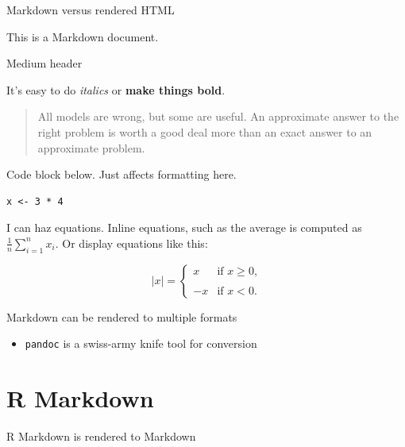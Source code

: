 \documentclass[ignorenonframetext,]{beamer}
\providecommand{\tightlist}{%
  \setlength{\itemsep}{0pt}\setlength{\parskip}{0pt}}
\begin{document}
\begin{frame}[fragile]{%
\protect\hypertarget{markdown-versus-rendered-html}{%
Markdown versus rendered HTML}}

This is a Markdown document.

Medium header

It’s easy to do \emph{italics} or \textbf{make things bold}.

\begin{quote}
All models are wrong, but some are useful. An approximate answer to the
right problem is worth a good deal more than an exact answer to an
approximate problem.
\end{quote}

Code block below. Just affects formatting here.

\begin{verbatim}
x <- 3 * 4
\end{verbatim}

I can haz equations. Inline equations, such as the average is computed
as \(\frac{1}{n} \sum_{i=1}^{n} x_{i}\). Or display equations like this:

\[
\begin{equation*}
|x|= 
\begin{cases} x & \text{if $x\ge 0$,} \\\\
-x &\text{if $x\lt 0$.}
\end{cases}
\end{equation*}
\]

\end{frame}

\begin{frame}[fragile]{%
\protect\hypertarget{markdown-can-be-rendered-to-multiple-formats}{%
Markdown can be rendered to multiple formats}}

\begin{itemize}
\tightlist
\item
  \texttt{pandoc} is a swiss-army knife tool for conversion
\end{itemize}

\end{frame}

\hypertarget{r-markdown}{%
\section{R Markdown}\label{r-markdown}}

\begin{frame}{%
\protect\hypertarget{r-markdown-is-rendered-to-markdown}{%
R Markdown is rendered to Markdown}}

\end{frame}
\end{document}
